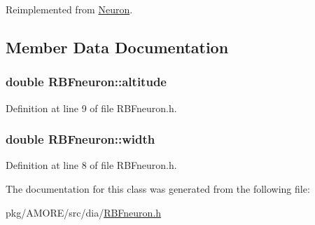 Reimplemented from \hyperlink{class_neuron_a95327aa80a9ec949491f214a0c159b5a}{Neuron}.



\subsection{Member Data Documentation}
\hypertarget{class_r_b_fneuron_a85827a29b503ea5c74b2d5316ab3dc15}{
\subsubsection[{altitude}]{\setlength{\rightskip}{0pt plus 5cm}double {\bf RBFneuron::altitude}}}
\label{class_r_b_fneuron_a85827a29b503ea5c74b2d5316ab3dc15}


Definition at line 9 of file RBFneuron.h.

\hypertarget{class_r_b_fneuron_a217b019acdac2e21edb29bad024ad872}{
\subsubsection[{width}]{\setlength{\rightskip}{0pt plus 5cm}double {\bf RBFneuron::width}}}
\label{class_r_b_fneuron_a217b019acdac2e21edb29bad024ad872}


Definition at line 8 of file RBFneuron.h.



The documentation for this class was generated from the following file:\begin{DoxyCompactItemize}
\item 
pkg/AMORE/src/dia/\hyperlink{_r_b_fneuron_8h}{RBFneuron.h}\end{DoxyCompactItemize}
